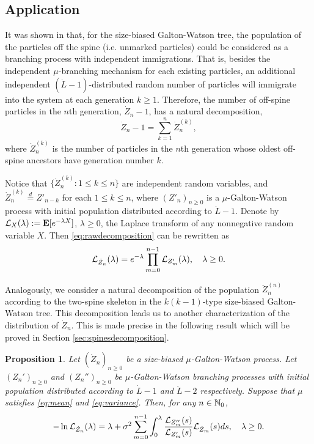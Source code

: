 \documentclass[12pt]{amsart}
\newtheorem{prop}[thm]{Proposition}
\numberwithin{equation}{section}
\newcommand{\eqlaw}{\overset{d}{=}}
\newcommand{\bE}{\mathbf E}\newcommand{\bbE}{\mathbb E}\newcommand{\cE}{\mathcal E}
\begin{document}
\subsection{Application}
	It was shown in \cite{lyons1995conceptual} that, for the size-biased Galton-Watson tree, the population of the particles off the spine (i.e. unmarked particles) could be considered as a branching process with independent immigrations.
	That is, besides the independent $\mu$-branching mechanism for each existing particles, an additional independent $(\dot L-1)$-distributed random number of particles will immigrate into the system at each generation $k\ge 1$.
	Therefore, the number of off-spine particles in the $n$th generation, $\dot Z_n-1$, has a natural decomposition,
\begin{equation}
\label{eq:rawdecomposition}
		\dot Z_n-1
	=
		\sum_{k=1}^{n}\dot Z_n^{(k)},
\end{equation}
	where $\dot Z^{(k)}_n$ is the number of particles in the $n$th generation whose oldest off-spine ancestors have generation number $k$.
\par	
	Notice that $\{\dot Z_n^{(k)}: 1\le k\le n\}$ are independent random variables, and $\dot Z_n^{(k)}\eqlaw Z'_{n-k}$ for each
		$1\le k\le n$, where $(Z'_n)_{n\ge 0}$ is a $\mu$-Galton-Watson process with initial population distributed according to $\dot L-1$.
	Denote by $\cL_X(\lambda):=\bE[e^{-\lambda X}]$, $\lambda \geq 0$, the Laplace  transform of
		any nonnegative random variable $X$.
	Then \eqref{eq:rawdecomposition} can be rewritten as
\begin{equation}
\label{eq:spinedecomposition}
		\mathcal L_{\dot Z_n}(\lambda)
	=
		e^{-\lambda}\prod_{m=0}^{n-1} \mathcal L_{Z'_m}(\lambda),
	\quad
		\lambda \geq 0.
\end{equation}
\par
	Analogously, we consider a natural decomposition of the population $\ddot Z_n^{(n)}$ according to the two-spine skeleton in the $k(k-1)$-type size-biased Galton-Watson tree. This decomposition leads us to another
	characterization of the distribution of $\dot Z_n$. This is made precise in the following result which will be proved in Section \ref{sec:spinesdecomposition}.
\begin{prop}
\label{lem:twospinedecomposition}
	Let $(\dot Z_n)_{n\ge 0}$ be a size-biased $\mu$-Galton-Watson process.
	Let $(Z_n')_{n\ge 0}$ and $(Z_n'')_{n\ge 0}$ be $\mu$-Galton-Watson branching processes with initial population distributed according to $\dot L-1$ and $\ddot L-2$ respectively.
	Suppose that $\mu$ satisfies \eqref{eq:mean} and \eqref{eq:variance}.
	Then, for any $n\in \mathbb N_0$,
\begin{equation}
\label{eq:twospinedecomposition}
		-\ln \mathcal L_{\dot Z_n}(\lambda)
	=
		\lambda+\sigma^2\sum_{m=0}^{n-1}\int_0^\lambda \frac{\mathcal L_{Z''_m}(s)}{\mathcal L_{Z'_m}(s)}\mathcal L_{\dot Z_m}(s)ds,
	\quad
		\lambda \geq 0.
\end{equation}
\end{prop}
\end{document}
